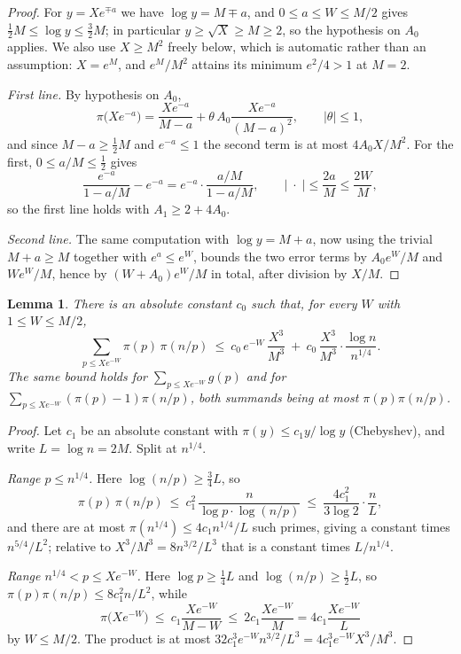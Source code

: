 \documentclass[a4paper,11pt,oneside,reqno]{amsart}
\theoremstyle{definition}
\theoremstyle{remark}
\theoremstyle{plain}
\newtheorem{lemma}[definition]{Lemma}
\begin{document}
\begin{proof}
  For \(y = Xe^{\mp a}\) we have \(\log y = M\mp a\), and \(0 \le a \le W \le M/2\)
  gives \(\tfrac{1}{2}M \le \log y \le \tfrac{3}{2}M\); in particular \(y \ge \sqrt X \ge M \ge 2\),
  so the hypothesis on \(A_0\) applies. We also use \(X \ge M^{2}\) freely below,
  which is automatic rather than an assumption: \(X = e^{M}\), and \(e^{M}/M^{2}\)
  attains its minimum \(e^{2}/4 > 1\) at \(M = 2\).

  \emph{First line.} By hypothesis on \(A_0\),
  \[
    \pi\bigl(Xe^{-a}\bigr)
      =\frac{Xe^{-a}}{M-a}+\theta\,A_0\frac{Xe^{-a}}{(M-a)^{2}},
      \qquad|\theta|\le 1 ,
  \]
  and since \(M-a \ge \tfrac{1}{2}M\) and \(e^{-a} \le 1\) the second term is at most
  \(4A_0X/M^{2}\). For the first, \(0 \le a/M \le \tfrac{1}{2}\) gives
  \[
    \frac{e^{-a}}{1-a/M}-e^{-a} = e^{-a} \cdot \frac{a/M}{1-a/M},
    \qquad\left|\;\cdot \;\right|\le \frac{2a}{M} \le \frac{2W}{M},
  \]
  so the first line holds with \(A_1 \ge 2+4A_0\).

  \emph{Second line.} The same computation with \(\log y = M+a\), now using the
  trivial \(M+a \ge M\) together with \(e^{a} \le e^{W}\), bounds the two error
  terms by \(A_0e^{W}/M\) and \(We^{W}/M\), hence by \((W+A_0)e^{W}/M\) in
  total, after division by \(X/M\).
\end{proof}

\begin{lemma}\label{lem:tail}
  There is an absolute constant \(c_0\) such that, for every \(W\) with
  \(1 \le W \le M/2\),
  \begin{equation}\label{eq:tailbound}
    \sum_{p \le Xe^{-W}}\pi(p)\,\pi(n/p)
      \ \le \ c_0\,e^{-W}\,\frac{X^{3}}{M^{3}}
      \ +\ c_0\,\frac{X^{3}}{M^{3}} \cdot \frac{\log n}{n^{1/4}} .
  \end{equation}
  The same bound holds for \(\sum_{p \le Xe^{-W}}g(p)\) and for
  \(\sum_{p \le Xe^{-W}}(\pi(p)-1)\pi(n/p)\), both summands being at most
  \(\pi(p)\pi(n/p)\).
\end{lemma}

\begin{proof}
  Let \(c_1\) be an absolute constant with \(\pi(y) \le c_1y/\log y\)
  (Chebyshev), and write \(L = \log n = 2M\). Split at \(n^{1/4}\).

  \emph{Range \(p \le n^{1/4}\).} Here \(\log(n/p) \ge \tfrac{3}{4}L\), so
  \[
    \pi(p)\,\pi(n/p)\ \le \ c_1^{2}\,\frac{n}{\log p \cdot \log(n/p)}
      \ \le \ \frac{4c_1^{2}}{3\log 2} \cdot \frac{n}{L} ,
  \]
  and there are at most \(\pi(n^{1/4}) \le 4c_1n^{1/4}/L\) such primes, giving a
  constant times \(n^{5/4}/L^{2}\); relative to \(X^{3}/M^{3} = 8n^{3/2}/L^{3}\)
  that is a constant times \(L/n^{1/4}\).

  \emph{Range \(n^{1/4} < p \le Xe^{-W}\).} Here \(\log p \ge \tfrac{1}{4}L\) and
  \(\log(n/p) \ge \tfrac{1}{2}L\), so \(\pi(p)\pi(n/p) \le 8c_1^{2}n/L^{2}\), while
  \[
    \pi\bigl(Xe^{-W}\bigr)\ \le \ c_1\frac{Xe^{-W}}{M-W}
      \ \le \ 2c_1\frac{Xe^{-W}}{M} = 4c_1\frac{Xe^{-W}}{L}
  \]
  by \(W \le M/2\). The product is at most
  \(32c_1^{3}e^{-W}n^{3/2}/L^{3} = 4c_1^{3}e^{-W}X^{3}/M^{3}\).
\end{proof}
\end{document}
